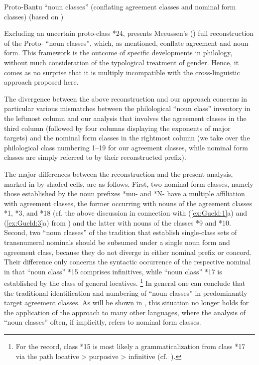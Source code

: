 \documentclass[output=collectionpaper]{langsci/langscibook}
\begin{document}
\begin{table}[b]
\caption{Proto-Bantu ``noun classes'' (conflating agreement classes and nominal form classes) (based on \citealt[96--99]{Meeussen1967})}
\label{tab:Gueld:2}
\end{table}

Excluding an uncertain proto-class *24,  presents Meeussen's (\citeyear[96--99]{Meeussen1967}) full reconstruction of the Proto- ``noun classes'', which, as mentioned, conflate agreement and noun form. This framework is the outcome of specific developments in  philology, without much consideration of the typological treatment of gender. Hence, it comes as no surprise that it is multiply incompatible with the cross-linguistic approach proposed here.

The divergence between the above  reconstruction and our approach concerns in particular various mismatches between the philological ``noun class'' inventory in the leftmost column and our analysis that involves the agreement classes in the third column (followed by four columns displaying the exponents of major targets) and the nominal form classes in the rightmost column (we take over the philological class numbering 1--19 for our agreement classes, while nominal form classes are simply referred to by their reconstructed prefix).

The major differences between the  reconstruction and the present analysis, marked in  by shaded cells, are as follows. First, two nominal form classes, namely those established by the noun prefixes *mu- and *N- have a multiple affiliation with agreement classes, the former occurring with nouns of the agreement classes *1, *3, and *18 (cf. the above discussion in connection with (\ref{ex:Gueld:1}a) and (\ref{ex:Gueld:3}a) from ) and the latter with nouns of the classes *9 and *10. Second, two ``noun classes'' of the  tradition that establish single-class sets of transnumeral nominals should be subsumed under a single noun form and agreement class, because they do not diverge in either nominal prefix or concord. Their difference only concerns the syntactic occurrence of the respective nominal in that ``noun class'' *15 comprises infinitives, while ``noun class'' *17 is established by the class of general locatives.%
\footnote{For the record, class *15 is most likely a grammaticalization from class *17 via the path locative > purposive > infinitive (cf.\ \citealt{Haspelmath1989}).} In general one can conclude that the traditional identification and numbering of ``noun classes'' in  predominantly target agreement classes. As will be shown in , this situation no longer holds for the application of the approach to many other  languages, where the analysis of ``noun classes'' often, if implicitly, refers to nominal form classes.
\end{document}
